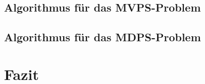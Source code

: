 \documentclass[11pt]{article}
\begin{document}
    \subsection{Algorithmus für das MVPS-Problem}
    \label{subsec:mvps}
	
    
    \subsection{Algorithmus für das MDPS-Problem}
    \label{subsec:mdps}
	
	
	\section{Fazit}
    \label{sec:fazit}
	

    
    
\end{document}
